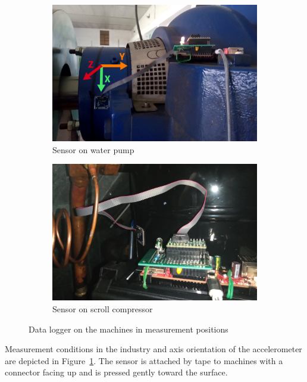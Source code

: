 \begin{figure}[h]
    \centering
    \begin{subfigure}[b]{0.49\textwidth}
        \includegraphics[width=\textwidth]{assets/design/sensor/sensor.jpg}
        \caption{Sensor on water pump}
    \end{subfigure}
    \hfill
    \begin{subfigure}[b]{0.49\textwidth}
        \includegraphics[width=\textwidth]{assets/design/sensor/sensor-compressor.jpg}
        \caption{Sensor on scroll compressor}
    \end{subfigure}
    \caption{Data logger on the machines in measurement positions}
    \label{fig:implementation:sensor-on-machine}
\end{figure}

Measurement conditions in the industry and axis orientation of the accelerometer are depicted in Figure~\ref{fig:implementation:sensor-on-machine}. The sensor is attached by tape to machines with a connector facing up and is pressed gently toward the surface.